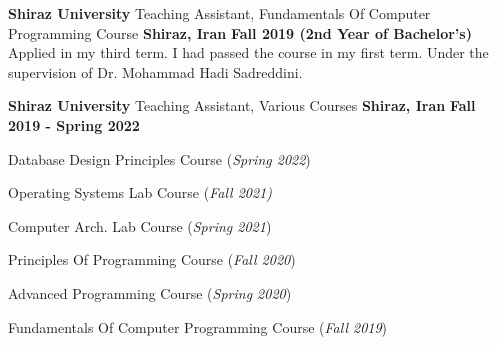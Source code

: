 \begin{cventries}
{    \cventry
    {\textbf{Shiraz University}} %
    {Teaching Assistant, Fundamentals Of Computer Programming Course} %
    {\textbf{Shiraz, Iran}} %
    {\textbf{Fall 2019 (2nd Year of Bachelor’s)}} %
    {
        Applied in my third term. I had passed the course in my first term. Under the supervision of Dr. Mohammad Hadi Sadreddini.
    }
}
{ 
    \cventry
    {\textbf{Shiraz University}} %
    {Teaching Assistant, Various Courses} %
    {\textbf{Shiraz, Iran}} %
    {\textbf{Fall 2019 - Spring 2022}} %
    {
      \begin{cvitems}
        \item {Database Design Principles Course (\emph{Spring 2022})}
        \item {Operating Systems Lab Course (\emph{Fall 2021)}}
        \item {Computer Arch. Lab Course (\emph{Spring 2021})}
        \item {Principles Of Programming Course (\emph{Fall 2020})}
        \item {Advanced Programming Course (\emph{Spring 2020})}
        \item {Fundamentals Of Computer Programming Course (\emph{Fall 2019})}
      \end{cvitems}
    }
}
\end{cventries}
